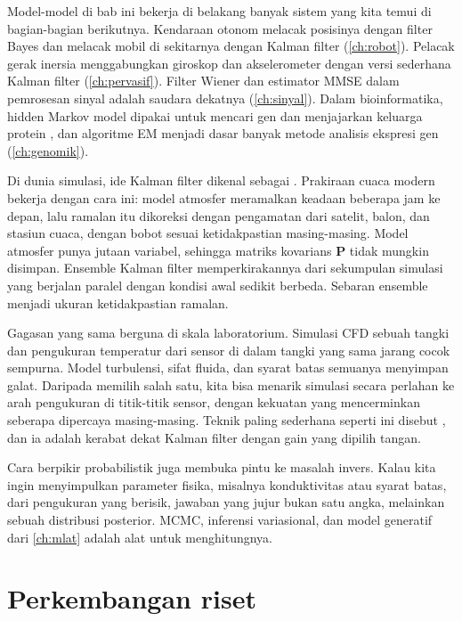 Model-model di bab ini bekerja di belakang banyak sistem yang kita temui di bagian-bagian berikutnya.
Kendaraan otonom melacak posisinya dengan filter Bayes dan melacak mobil di sekitarnya dengan Kalman
filter (\cref{ch:robot}). Pelacak gerak inersia menggabungkan giroskop dan akselerometer dengan versi
sederhana Kalman filter (\cref{ch:pervasif}). Filter Wiener dan estimator MMSE dalam pemrosesan sinyal
adalah saudara dekatnya (\cref{ch:sinyal}). Dalam bioinformatika, hidden Markov model dipakai untuk
mencari gen dan menjajarkan keluarga protein \citep{durbin1998}, dan algoritme EM menjadi dasar banyak
metode analisis ekspresi gen (\cref{ch:genomik}).

Di dunia simulasi, ide Kalman filter dikenal sebagai . Prakiraan cuaca
modern bekerja dengan cara ini: model atmosfer meramalkan keadaan beberapa jam ke depan, lalu
ramalan itu dikoreksi dengan pengamatan dari satelit, balon, dan stasiun cuaca, dengan bobot sesuai
ketidakpastian masing-masing. Model atmosfer punya jutaan variabel, sehingga matriks kovarians
$\bm P$ tidak mungkin disimpan. Ensemble Kalman filter \citep{evensen1994} memperkirakannya dari
sekumpulan simulasi yang berjalan paralel dengan kondisi awal sedikit berbeda. Sebaran ensemble
menjadi ukuran ketidakpastian ramalan.

Gagasan yang sama berguna di skala laboratorium. Simulasi CFD sebuah tangki dan pengukuran
temperatur dari sensor di dalam tangki yang sama jarang cocok sempurna. Model turbulensi,
sifat fluida, dan syarat batas semuanya menyimpan galat. Daripada memilih salah satu, kita bisa
menarik simulasi secara perlahan ke arah pengukuran di titik-titik sensor, dengan kekuatan yang
mencerminkan seberapa dipercaya masing-masing. Teknik paling sederhana seperti ini disebut
, dan ia adalah kerabat dekat Kalman filter dengan gain yang dipilih tangan.

Cara berpikir probabilistik juga membuka pintu ke masalah invers. Kalau kita ingin menyimpulkan
parameter fisika, misalnya konduktivitas atau syarat batas, dari pengukuran yang berisik, jawaban
yang jujur bukan satu angka, melainkan sebuah distribusi posterior. MCMC, inferensi variasional, dan
model generatif dari \cref{ch:mlat} adalah alat untuk menghitungnya.

\section{Perkembangan riset}

